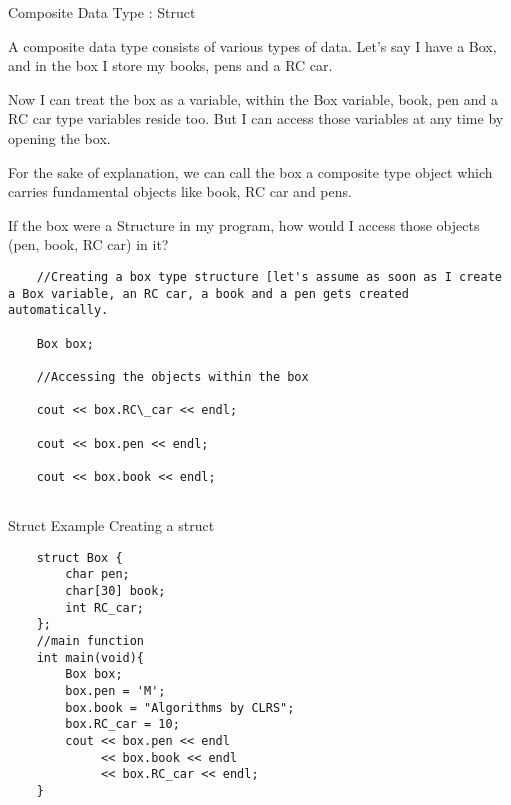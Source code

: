 \documentclass[newPxFont]{beamer}
\begin{document}
\begin{frame}[allowframebreaks]{Composite Data Type : Struct}

A composite data type consists of various types of data. Let's say I have a \alert{Box}, and in the box I store my books, pens and a RC car. 

Now I can treat the box as a variable, within the \alert{Box} variable, book, pen and a RC car type variables reside too. But I can access those variables at any time by opening the box. 

For the sake of explanation, we can call the box a composite type object which carries fundamental objects like book, RC car and pens.

\vspace{2em}

\begin{exampleblock}{If the box were a \alert{Structure} in my program, how would I access those objects (pen, book, RC car) in it?}

\begin{verbatim}
    //Creating a box type structure [let's assume as soon as I create a Box variable, an RC car, a book and a pen gets created automatically. 

    Box box;
    
    //Accessing the objects within the box
    
    cout << box.RC\_car << endl;
    
    cout << box.pen << endl;
    
    cout << box.book << endl;
    
\end{verbatim}

\end{exampleblock}


\end{frame}

\begingroup
{}

\begin{frame}{Struct Example}
Creating a \alert{struct}
\begin{verbatim}
    struct Box {
        char pen;
        char[30] book;
        int RC_car;
    };
    //main function
    int main(void){
        Box box;
        box.pen = 'M';
        box.book = "Algorithms by CLRS";
        box.RC_car = 10;
        cout << box.pen << endl 
             << box.book << endl
             << box.RC_car << endl;
    }
\end{verbatim}

\end{frame}
\end{document}
